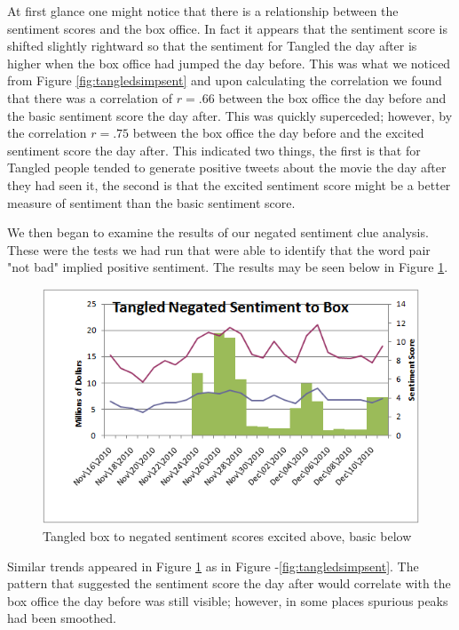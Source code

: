 \documentclass[11pt]{article}
\begin{document}
At first glance one might notice that there is a relationship between the sentiment scores and the box office. In fact it appears that the sentiment score is shifted slightly rightward so that the sentiment for Tangled the day after is higher when the box office had jumped the day before. This was what we noticed from Figure \ref{fig:tangledsimpsent} and upon calculating the correlation we found that there was a correlation of $r=.66$ between the box office the day before and the basic sentiment score the day after. This was quickly superceded; however, by the correlation $r=.75$ between the box office the day before and the excited sentiment score the day after. This indicated two things, the first is that for Tangled people tended to generate positive tweets about the movie the day after they had seen it, the second is that the excited sentiment score might be a better measure of sentiment than the basic sentiment score.

We then began to examine the results of our negated sentiment clue analysis. These were the tests we had run that were able to identify that the word pair "not bad" implied positive sentiment. The results may be seen below in Figure \ref{fig:tangledsent}. 

\begin{figure}[ht!]
\centering
\includegraphics[scale=.55]{img/tangledsent.png} 
\caption{Tangled box to negated sentiment scores excited above, basic below}
\label{fig:tangledsent}
\end{figure}

Similar trends appeared in Figure \ref{fig:tangledsent} as in Figure -\ref{fig:tangledsimpsent}. The pattern that suggested the sentiment score the day after would correlate with the box office the day before was still visible; however, in some places spurious peaks had been smoothed.
\end{document}
